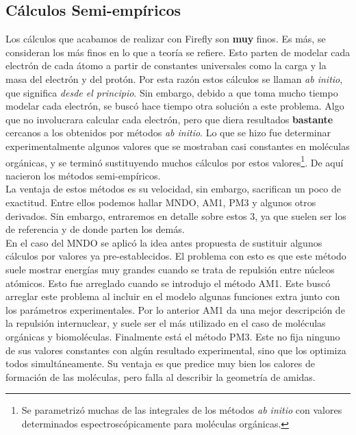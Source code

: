 \documentclass[10pt,letterpaper]{article}
\begin{document}
\subsection{C\'alculos Semi-emp\'iricos}
Los c\'alculos que acabamos de realizar con Firefly son \textbf{muy} finos. Es m\'as, se consideran los m\'as finos en lo que a teor\'ia se refiere. Esto parten de modelar cada electr\'on de cada \'atomo a partir de constantes universales como la carga y la masa del electr\'on y del prot\'on. Por esta raz\'on estos c\'alculos se llaman \textit{ab initio}, que significa \emph{desde el principio}. Sin embargo, debido a que toma mucho tiempo modelar cada electr\'on, se busc\'o hace tiempo otra soluci\'on a este problema. Algo que no involucrara calcular cada electr\'on, pero que diera resultados \textbf{bastante} cercanos a los obtenidos por m\'etodos \textit{ab initio}. Lo que se hizo fue determinar experimentalmente algunos valores que se mostraban casi constantes en mol\'eculas org\'anicas, y se termin\'o sustituyendo muchos c\'alculos por estos valores\footnote{Se parametriz\'o muchas de las integrales de los m\'etodos \textit{ab initio} con valores determinados espectrosc\'opicamente para mol\'eculas org\'anicas.}. De aqu\'i nacieron los m\'etodos semi-emp\'iricos.\\

La ventaja de estos m\'etodos es su velocidad, sin embargo, sacrifican un poco de exactitud. Entre ellos podemos hallar MNDO, AM1, PM3 y algunos otros derivados. Sin embargo, entraremos en detalle sobre estos 3, ya que suelen ser los de referencia y de donde parten los dem\'as.\\

En el caso del MNDO se aplic\'o la idea antes propuesta de sustituir algunos c\'alculos por valores ya pre-establecidos. El problema con esto es que este m\'etodo suele mostrar energ\'ias muy grandes cuando se trata de repulsi\'on entre n\'ucleos at\'omicos. Esto fue arreglado cuando se introdujo el m\'etodo AM1. Este busc\'o arreglar este problema al incluir en el modelo algunas funciones extra junto con los par\'ametros experimentales. Por lo anterior AM1 da una mejor descripci\'on de la repulsi\'on internuclear, y suele ser el m\'as utilizado en el caso de mol\'eculas org\'anicas y biomol\'eculas. Finalmente est\'a el m\'etodo PM3. Este no fija ninguno de sus valores constantes con alg\'un resultado experimental, sino que los optimiza todos simult\'aneamente. Su ventaja es que predice muy bien los calores de formaci\'on de las mol\'eculas, pero falla al describir la geometr\'ia de amidas.\\
\end{document}
